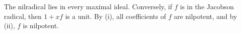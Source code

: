 The nilradical lies in every maximal ideal. Conversely, if $f$ is in the Jacobson radical, then $1+xf$ is a unit. By (i), all coefficients of $f$ are nilpotent, and by (ii), $f$ is nilpotent.
